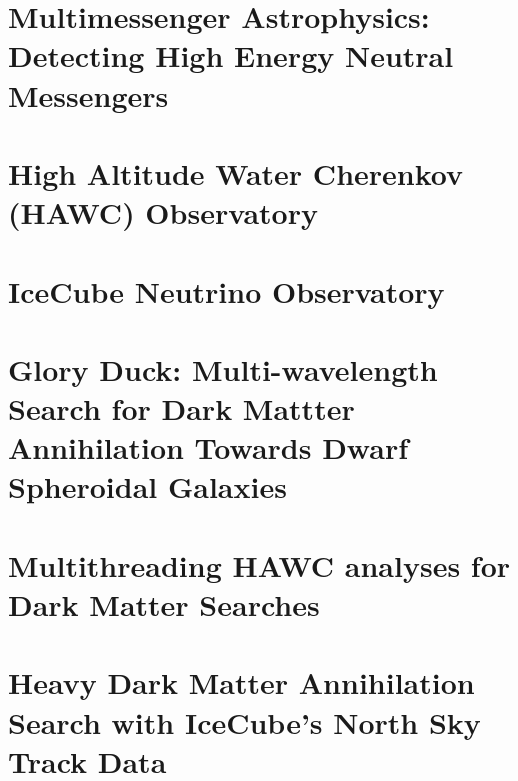 \documentclass[PhD]{msu-thesis}
\begin{document}
\chapter{Multimessenger Astrophysics: Detecting High Energy Neutral Messengers\label{sec:multmessenger}}


\chapter{High Altitude Water Cherenkov (HAWC) Observatory\label{sec:hawc}}


\chapter{IceCube Neutrino Observatory\label{sec:ice3}}


\chapter{Glory Duck: Multi-wavelength Search for Dark Mattter Annihilation Towards Dwarf Spheroidal Galaxies}\label{sec:glory_duck}


\chapter{Multithreading HAWC analyses for Dark Matter Searches} \label{sec:multithread}


\chapter{Heavy Dark Matter Annihilation Search with IceCube's North Sky Track Data} \label{sec:ic3_dm}
\end{document}
